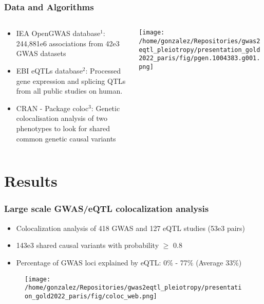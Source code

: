 \documentclass{beamer}
\begin{document}
\begin{frame}
\frametitle{Data and Algorithms}

\begin{columns}
\begin{column}{0.5\textwidth}
\begin{itemize}
\item IEA OpenGWAS database$^1$: 244,881e6 associations from 42e3 GWAS datasets
\item EBI eQTLs database$^2$: Processed gene expression and splicing QTLs from all public studies on human.
\item CRAN - Package coloc$^3$: Genetic colocalisation analysis of two phenotypes to look for shared common genetic causal variants
\end{itemize}
\end{column}
\begin{column}{0.5\textwidth}
\begin{center}
\texttt{[image: /home/gonzalez/Repositories/gwas2eqtl\_pleiotropy/presentation\_gold2022\_paris/fig/pgen.1004383.g001.png]}
\end{center}
\end{column}
\end{columns}

\let\thefootnote\relax{}
\let\thefootnote\relax{}
\let\thefootnote\relax{}
\end{frame}


\section{Results}

\begin{frame}
\frametitle{Large scale GWAS/eQTL colocalization analysis}

\begin{itemize}
\item Colocalization analysis of 418 GWAS and 127 eQTL studies (53e3 pairs)
\item 143e3 shared causal variants with probability $\geq$ 0.8
\item Percentage of GWAS loci explained by eQTL: 0$\%$ - 77$\%$ (Average 33$\%$)
\end{itemize}

\begin{figure}[!]
\texttt{[image: /home/gonzalez/Repositories/gwas2eqtl\_pleiotropy/presentation\_gold2022\_paris/fig/coloc\_web.png]}
\end{figure}

\end{frame}
\end{document}
